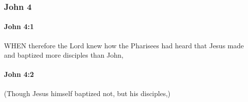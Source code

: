	\subsubsection{John 4} %
		\label{JOHN-4}
		
		\paragraph{John 4:1} %
			\label{JOHN-4-1}

			WHEN therefore the Lord knew how the Pharisees had heard that Jesus made and baptized more disciples than John,

			\begin{framed}
			\scriptsize
				\begin{compactdesc}
					\item[SBLG] 
				\end{compactdesc}
			\end{framed}

		\paragraph{John 4:2} %
			\label{JOHN-4-2}

			(Though Jesus himself baptized not, but his disciples,)

